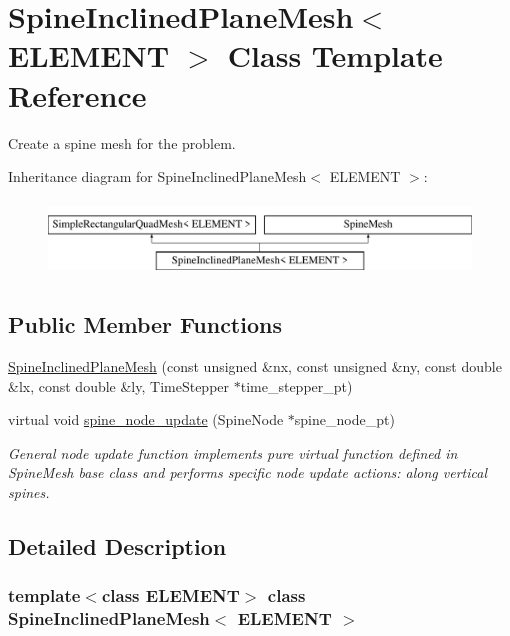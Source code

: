 \hypertarget{classSpineInclinedPlaneMesh}{}\section{Spine\+Inclined\+Plane\+Mesh$<$ E\+L\+E\+M\+E\+NT $>$ Class Template Reference}
\label{classSpineInclinedPlaneMesh}


Create a spine mesh for the problem.  


Inheritance diagram for Spine\+Inclined\+Plane\+Mesh$<$ E\+L\+E\+M\+E\+NT $>$\+:\begin{figure}[H]
\begin{center}
\leavevmode
\includegraphics[height=2.000000cm]{classSpineInclinedPlaneMesh}
\end{center}
\end{figure}
\subsection*{Public Member Functions}
\begin{DoxyCompactItemize}
\item 
\hyperlink{classSpineInclinedPlaneMesh_a97e770220d4cd41e11c86c5cfa289133}{Spine\+Inclined\+Plane\+Mesh} (const unsigned \&nx, const unsigned \&ny, const double \&lx, const double \&ly, Time\+Stepper $\ast$time\+\_\+stepper\+\_\+pt)
\item 
virtual void \hyperlink{classSpineInclinedPlaneMesh_a01fa9c443029a6a00b1679a6785029f6}{spine\+\_\+node\+\_\+update} (Spine\+Node $\ast$spine\+\_\+node\+\_\+pt)
\begin{DoxyCompactList}\small\item\em General node update function implements pure virtual function defined in Spine\+Mesh base class and performs specific node update actions\+: along vertical spines. \end{DoxyCompactList}\end{DoxyCompactItemize}


\subsection{Detailed Description}
\subsubsection*{template$<$class E\+L\+E\+M\+E\+NT$>$\newline
class Spine\+Inclined\+Plane\+Mesh$<$ E\+L\+E\+M\+E\+N\+T $>$}

